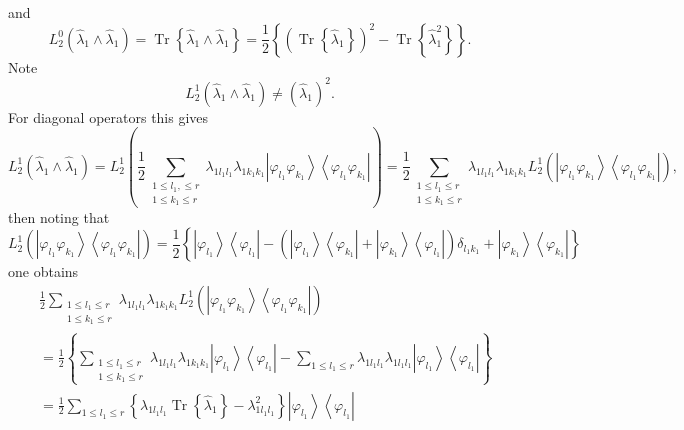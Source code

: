 \documentclass[aps,preprint]{revtex4}%
\begin{document}
and
\[
L_{2}^{0}\left(  \hat{\lambda}_{1}\wedge\hat{\lambda}_{1}\right)
=\operatorname*{Tr}\left\{  \hat{\lambda}_{1}\wedge\hat{\lambda}_{1}\right\}
=\frac{1}{2}\left\{  \left(  \operatorname*{Tr}\left\{  \hat{\lambda}%
_{1}\right\}  \right)  ^{2}-\operatorname*{Tr}\left\{  \hat{\lambda}_{1}%
^{2}\right\}  \right\}  .
\]
Note
\[
L_{2}^{1}\left(  \hat{\lambda}_{1}\wedge\hat{\lambda}_{1}\right)  \neq\left(
\hat{\lambda}_{1}\right)  ^{2}.
\]
For diagonal operators this gives
\[
L_{2}^{1}\left(  \hat{\lambda}_{1}\wedge\hat{\lambda}_{1}\right)  =L_{2}%
^{1}\left(  \frac{1}{2}\sum_{\substack{1\leq l_{1},\leq r\\1\leq k_{1}\leq
r}}\lambda_{1l_{1}l_{1}}\lambda_{1k_{1}k_{1}}\left\vert \varphi_{l_{1}}%
\varphi_{k_{1}}\right\rangle \left\langle \varphi_{l_{1}}\varphi_{k_{1}%
}\right\vert \right)  =\frac{1}{2}\sum_{\substack{1\leq l_{1}\leq r\\1\leq
k_{1}\leq r}}\lambda_{1l_{1}l_{1}}\lambda_{1k_{1}k_{1}}L_{2}^{1}\left(
\left\vert \varphi_{l_{1}}\varphi_{k_{1}}\right\rangle \left\langle
\varphi_{l_{1}}\varphi_{k_{1}}\right\vert \right)  ,
\]
then noting that
\[
L_{2}^{1}\left(  \left\vert \varphi_{l_{1}}\varphi_{k_{1}}\right\rangle
\left\langle \varphi_{l_{1}}\varphi_{k_{1}}\right\vert \right)  =\frac{1}%
{2}\left\{  \left\vert \varphi_{l_{1}}\right\rangle \left\langle
\varphi_{l_{1}}\right\vert -\left(  \left\vert \varphi_{l_{1}}\right\rangle
\left\langle \varphi_{k_{1}}\right\vert +\left\vert \varphi_{k_{1}%
}\right\rangle \left\langle \varphi_{l_{1}}\right\vert \right)  \delta
_{l_{1}k_{1}}+\left\vert \varphi_{k_{1}}\right\rangle \left\langle
\varphi_{k_{1}}\right\vert \right\}
\]
one obtains%
\begin{align*}
&  \frac{1}{2}\sum_{\substack{1\leq l_{1}\leq r\\1\leq k_{1}\leq r}%
}\lambda_{1l_{1}l_{1}}\lambda_{1k_{1}k_{1}}L_{2}^{1}\left(  \left\vert
\varphi_{l_{1}}\varphi_{k_{1}}\right\rangle \left\langle \varphi_{l_{1}%
}\varphi_{k_{1}}\right\vert \right) \\
&  =\frac{1}{2}\left\{  \sum_{\substack{1\leq l_{1}\leq r\\1\leq k_{1}\leq
r}}\lambda_{1l_{1}l_{1}}\lambda_{1k_{1}k_{1}}\left\vert \varphi_{l_{1}%
}\right\rangle \left\langle \varphi_{l_{1}}\right\vert -\sum_{1\leq l_{1}\leq
r}\lambda_{1l_{1}l_{1}}\lambda_{1l_{1}l_{1}}\left\vert \varphi_{l_{1}%
}\right\rangle \left\langle \varphi_{l_{1}}\right\vert \right\} \\
&  =\frac{1}{2}\sum_{1\leq l_{1}\leq r}\left\{  \lambda_{1l_{1}l_{1}%
}\operatorname*{Tr}\left\{  \hat{\lambda}_{1}\right\}  -\lambda_{1l_{1}l_{1}%
}^{2}\right\}  \left\vert \varphi_{l_{1}}\right\rangle \left\langle
\varphi_{l_{1}}\right\vert
\end{align*}
\end{document}
